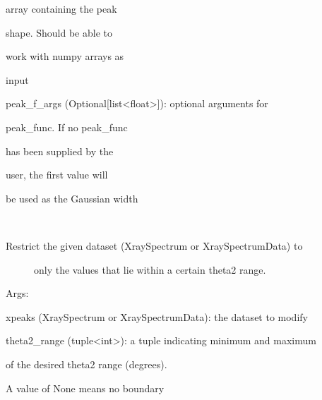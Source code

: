 \documentclass[letterpaper,10pt,english]{sphinxmanual}
\begin{document}
\begin{fulllineitems}
\begin{DUlineblock}{0em}
\begin{DUlineblock}{\DUlineblockindent}
\begin{DUlineblock}{\DUlineblockindent}
\begin{DUlineblock}{\DUlineblockindent}
\item[] array containing the peak
\item[] shape. Should be able to
\item[] work with numpy arrays as
\item[] input
\end{DUlineblock}
\end{DUlineblock}
\item[] peak\_f\_args (Optional{[}list\textless{}float\textgreater{}{]}): optional arguments for
\item[]
\begin{DUlineblock}{\DUlineblockindent}
\item[] peak\_func. If no peak\_func
\item[] has been supplied by the
\item[] user, the first value will
\item[] be used as the Gaussian width
\end{DUlineblock}
\end{DUlineblock}
\end{DUlineblock}

\begin{fulllineitems}
\label{doctree/soprano.calculate.xrd.xrd:soprano.calculate.xrd.xrd.XRDCalculator.dataset_range}~\begin{description}
\item[{Restrict the given dataset (XraySpectrum or XraySpectrumData) to}] \leavevmode
only the values that lie within a certain theta2 range.

\end{description}

\begin{DUlineblock}{0em}
\item[] Args:
\item[]
\begin{DUlineblock}{\DUlineblockindent}
\item[] xpeaks (XraySpectrum or XraySpectrumData): the dataset to modify
\item[] theta2\_range (tuple\textless{}int\textgreater{}): a tuple indicating minimum and maximum
\item[]
\begin{DUlineblock}{\DUlineblockindent}
\item[] of the desired theta2 range (degrees).
\item[] A value of None means no boundary
\end{DUlineblock}
\end{DUlineblock}
\end{DUlineblock}


\end{fulllineitems}
\end{fulllineitems}
\end{document}
